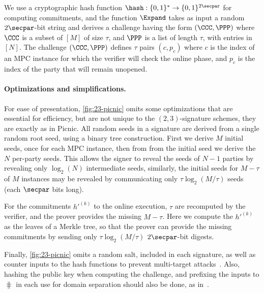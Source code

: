 We use a cryptographic hash function $\hash: \{0,1\}^*\to \{0,1\}^{2\secpar}$
for computing commitments, and the function $\Expand$ takes as input a random $2\secpar$-bit string
and derives a challenge having the form $(\CCC, \PPP)$ where $\CCC$ is a subset of $[M]$
of size $\tau$, and $\PPP$ is a list of length $\tau$, with entries in $[N]$.
The challenge $(\CCC, \PPP)$ defines $\tau$ pairs $(c,p_c)$ where $c$ is the
index of  an MPC instance for which the verifier will check the online phase,
and $p_c$ is the index of the party that will remain unopened.


\paragraph{Optimizations and simplifications.}
For ease of presentation, \cref{fig:23-picnic} omits some optimizations that
are essential for efficiency, but are not unique to the $(2,3)$-signature schemes,
they are exactly as in Picnic. All random seeds in a signature are derived from
a single random root seed, using a binary tree construction. First we derive
$M$ initial seeds, once for each MPC instance, then from from the initial seed
we derive the $N$ per-party seeds. This allows the signer to reveal the seeds
of $N-1$ parties by revealing only $\log_2(N)$ intermediate seeds, similarly,
the initial seeds for $M-\tau$ of $M$ instances may be revealed by communicating
only $\tau\log_2(M/\tau)$ seeds (each $\secpar$ bits long).

For the commitments $h'^{(k)}$ to the online execution, $\tau$ are recomputed
by the verifier, and the prover provides the missing $M-\tau$.  Here we compute
the $h'^{(k)}$ as the leaves of a Merkle tree,  so that the prover can provide
the missing commitments by sending only $\tau\log_2(M/\tau)$ $2\secpar$-bit
digests.

Finally, \cref{fig:23-picnic} omits a random salt, included in each signature, as well as counter
inputs to the hash functions to prevent multi-target
attacks~\cite{dinur2019-picnic-attacks}. Also, hashing the public key when computing the
challenge, and prefixing the inputs to $\hash$ in each use for domain
separation should also be done, as in~\cite{picnic-spec}.

